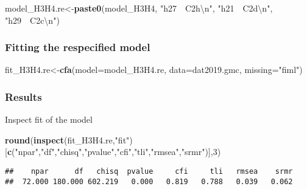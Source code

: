 \documentclass[
]{article}
\newenvironment{Shaded}{\begin{snugshade}}{\end{snugshade}}
\newcommand{\CharTok}[1]{\textcolor[rgb]{0.31,0.60,0.02}{#1}}
\newcommand{\DataTypeTok}[1]{\textcolor[rgb]{0.13,0.29,0.53}{#1}}
\newcommand{\DecValTok}[1]{\textcolor[rgb]{0.00,0.00,0.81}{#1}}
\newcommand{\KeywordTok}[1]{\textcolor[rgb]{0.13,0.29,0.53}{\textbf{#1}}}
\newcommand{\NormalTok}[1]{#1}
\newcommand{\StringTok}[1]{\textcolor[rgb]{0.31,0.60,0.02}{#1}}
\begin{document}
\begin{Shaded}
\begin{Highlighting}[]
\NormalTok{model_H3H4.re<-}\KeywordTok{paste0}\NormalTok{(model_H3H4,}
                      \StringTok{"h27~~C2h}\CharTok{\textbackslash{}n}\StringTok{"}\NormalTok{,}
                      \StringTok{"h21~~C2d}\CharTok{\textbackslash{}n}\StringTok{"}\NormalTok{,}
                      \StringTok{"h29~~C2c}\CharTok{\textbackslash{}n}\StringTok{"}\NormalTok{)}
\end{Highlighting}
\end{Shaded}

\hypertarget{fitting-the-respecified-model-1}{%
\subsubsection{Fitting the respecified
model}\label{fitting-the-respecified-model-1}}

\begin{Shaded}
\begin{Highlighting}[]
\NormalTok{fit_H3H4.re<-}\KeywordTok{cfa}\NormalTok{(}\DataTypeTok{model=}\NormalTok{model_H3H4.re,}
              \DataTypeTok{data=}\NormalTok{dat2019.gmc,}
              \DataTypeTok{missing=}\StringTok{"fiml"}\NormalTok{)}
\end{Highlighting}
\end{Shaded}

\hypertarget{results-2}{%
\subsubsection{Results}\label{results-2}}

Inspect fit of the model

\begin{Shaded}
\begin{Highlighting}[]
\KeywordTok{round}\NormalTok{(}\KeywordTok{inspect}\NormalTok{(fit_H3H4.re,}\StringTok{"fit"}\NormalTok{)}
\NormalTok{      [}\KeywordTok{c}\NormalTok{(}\StringTok{"npar"}\NormalTok{,}\StringTok{"df"}\NormalTok{,}\StringTok{"chisq"}\NormalTok{,}\StringTok{"pvalue"}\NormalTok{,}\StringTok{"cfi"}\NormalTok{,}\StringTok{"tli"}\NormalTok{,}\StringTok{"rmsea"}\NormalTok{,}\StringTok{"srmr"}\NormalTok{)],}\DecValTok{3}\NormalTok{)}
\end{Highlighting}
\end{Shaded}

\begin{verbatim}
##    npar      df   chisq  pvalue     cfi     tli   rmsea    srmr 
##  72.000 180.000 602.219   0.000   0.819   0.788   0.039   0.062
\end{verbatim}
\end{document}
